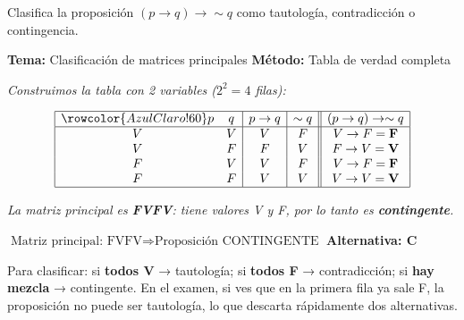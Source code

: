 \vspace{0.5cm}

\begin{tcolorbox}[
  enhanced, breakable,
  colback=GrisClaro, colframe=AzulPizarra,
  fonttitle=\bfseries\sffamily,
  title={Ejercicio 14 — Clasificar: $(p \rightarrow q) \rightarrow \sim q$},
  arc=3pt, boxrule=0.8pt
]

\begin{problema}
Clasifica la proposición $(p \rightarrow q) \rightarrow \sim q$ como tautología, contradicción o contingencia.
\end{problema}

\smallskip
\noindent
\textbf{\sffamily\color{AzulMedio}Tema:} Clasificación de matrices principales \hfill
\textbf{\sffamily\color{AzulMedio}Método:} Tabla de verdad completa

\medskip
\noindent\textit{Construimos la tabla con 2 variables ($2^2 = 4$ filas):}

\[
\begin{array}{|cc|c|c||c|}
\hline
\rowcolor{AzulClaro!60}
p & q & p \rightarrow q & \sim q & (p \rightarrow q) \rightarrow \sim q \\
\hline
V & V & V & F & V \rightarrow F = \mathbf{F} \\
V & F & F & V & F \rightarrow V = \mathbf{V} \\
F & V & V & F & V \rightarrow F = \mathbf{F} \\
F & F & V & V & V \rightarrow V = \mathbf{V} \\
\hline
\end{array}
\]

\noindent\textit{La matriz principal es \textbf{FVFV}: tiene valores V y F, por lo tanto es \textbf{contingente}.}

\begin{tcolorbox}[colback=AzulClaro!60, colframe=AzulPizarra, arc=2pt, boxrule=0.8pt, left=8pt, right=8pt]
\centering
$\displaystyle \boxed{\text{Matriz principal: FVFV} \Rightarrow \text{Proposición CONTINGENTE}}$ \quad \textbf{Alternativa: C}
\end{tcolorbox}

\begin{cajatip}
Para clasificar: si \textbf{todos V} → tautología; si \textbf{todos F} → contradicción; si \textbf{hay mezcla} → contingente. En el examen, si ves que en la primera fila ya sale F, la proposición no puede ser tautología, lo que descarta rápidamente dos alternativas.
\end{cajatip}
\end{tcolorbox}

